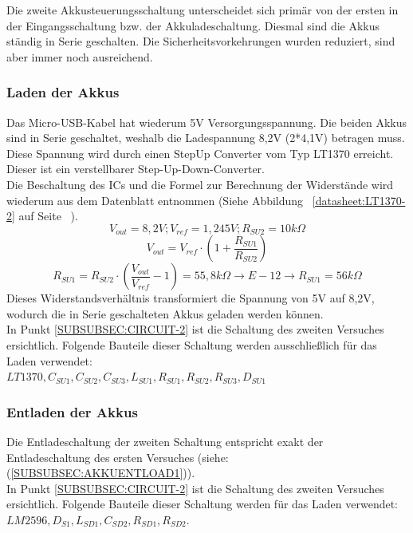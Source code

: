 \documentclass[12pt,a4paper]{article}
\begin{document}
Die zweite Akkusteuerungsschaltung unterscheidet sich primär von der ersten in der Eingangsschaltung bzw. der Akkuladeschaltung. Diesmal sind die Akkus ständig in Serie geschalten. Die Sicherheitsvorkehrungen wurden reduziert, sind aber immer noch ausreichend.

\subsubsection{Laden der Akkus}
\label{SUBSUBSEC:AKKULOAD2}

Das Micro-USB-Kabel hat wiederum 5V Versorgungsspannung. Die beiden Akkus sind in Serie geschaltet, weshalb die Ladespannung 8,2V (2*4,1V) betragen muss. Diese Spannung wird durch einen StepUp Converter vom Typ LT1370 erreicht. Dieser ist ein verstellbarer Step-Up-Down-Converter. \\
Die Beschaltung des ICs und die Formel zur Berechnung der Widerstände wird wiederum aus dem Datenblatt entnommen (Siehe Abbildung ~\ref{datasheet:LT1370-2} auf Seite ~\pageref{datasheet:LT1370-2}). \\
\[V_{out}=8,2V;V_{ref}=1,245V;R_{SU2}=10k\Omega\]
\[V_{out}=V_{ref} \cdot \left( 1 + \frac{R_{SU1}}{R_{SU2}} \right)\]
\[R_{SU1} = R_{SU2} \cdot \left( \frac{V_{out}}{V_{ref}} - 1 \right) = 55,8 k\Omega \rightarrow E-12 \rightarrow R_{SU1} = 56 k \Omega\]
\vspace{1cm}
Dieses Widerstandsverhältnis transformiert die Spannung von 5V auf 8,2V, wodurch die in Serie geschalteten Akkus geladen werden können.  \\
In Punkt \ref{SUBSUBSEC:CIRCUIT-2} ist die Schaltung des zweiten Versuches ersichtlich. Folgende Bauteile dieser Schaltung werden ausschließlich für das Laden verwendet:\\ $LT1370,C_{SU1},C_{SU2},C_{SU3}, L_{SU1},R_{SU1},R_{SU2},R_{SU3},D_{SU1}$ 

\subsubsection{Entladen der Akkus}
\label{SUBSUBSEC:AKKUENTLOAD2}

Die Entladeschaltung der zweiten Schaltung entspricht exakt der Entladeschaltung des ersten Versuches (siehe:  (\ref{SUBSUBSEC:AKKUENTLOAD1})).\\
In Punkt \ref{SUBSUBSEC:CIRCUIT-2} ist die Schaltung des zweiten Versuches ersichtlich. Folgende Bauteile dieser Schaltung werden für das Laden verwendet:\\ $LM2596,D_{S1},L_{SD1},C_{SD2},R_{SD1},R_{SD2}$. 
\newpage
\end{document}
